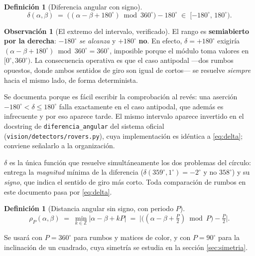 \documentclass[11pt,a4paper]{article}
\theoremstyle{definition}
\newtheorem{definicion}[teorema]{Definición}
\newtheorem{observacion}[teorema]{Observación}
\newcommand{\grados}{^{\circ}}
\begin{document}
\begin{definicion}[Diferencia angular con signo]
\begin{equation}
  \delta(\alpha,\beta) \;=\; \big((\alpha-\beta+180\grados) \bmod 360\grados\big) - 180\grados
  \;\in\; [-180\grados,\,180\grados).
  \label{eq:delta}
\end{equation}
\end{definicion}

\begin{observacion}[El extremo del intervalo, verificado]
\label{obs:delta180}
El rango es \textbf{semiabierto por la derecha}: $-180\grados$ \emph{se alcanza} y
$+180\grados$ \textbf{no}. En efecto, $\delta = +180\grados$ exigiría
$(\alpha-\beta+180\grados)\bmod 360\grados = 360\grados$, imposible porque el módulo
toma valores en $[0\grados,360\grados)$. La consecuencia operativa es que el caso
antipodal ---dos rumbos opuestos, donde ambos sentidos de giro son igual de cortos---
se resuelve \emph{siempre} hacia el mismo lado, de forma determinista.

Se documenta porque es fácil escribir la comprobación al revés: una aserción
$-180\grados < \delta \le 180\grados$ falla exactamente en el caso antipodal, que
además es infrecuente y por eso aparece tarde. El mismo intervalo aparece invertido en
el docstring de \texttt{diferencia\_angular} del sistema oficial
(\texttt{vision/detectors/rovers.py}), cuya implementación es idéntica a
\eqref{eq:delta}; conviene señalarlo a la organización.
\end{observacion}

$\delta$ es la única función que resuelve simultáneamente los dos problemas del
círculo: entrega la \emph{magnitud} mínima de la diferencia
($\delta(359\grados,1\grados) = -2\grados$ y no $358\grados$) y su \emph{signo}, que
indica el sentido de giro más corto. Toda comparación de rumbos en este documento pasa
por \eqref{eq:delta}.

\begin{definicion}[Distancia angular sin signo, con periodo $P$]
\begin{equation}
  \rho_P(\alpha,\beta) \;=\; \min_{k\in\mathbb{Z}} \big|\alpha - \beta + kP\big|
  \;=\; \Big|\big((\alpha-\beta+\tfrac{P}{2}) \bmod P\big) - \tfrac{P}{2}\Big|.
  \label{eq:rhoP}
\end{equation}
\end{definicion}

Se usará con $P = 360\grados$ para rumbos y matices de color, y con $P = 90\grados$
para la inclinación de un cuadrado, cuya simetría se estudia en la
sección \ref{sec:simetria}.
\end{document}
